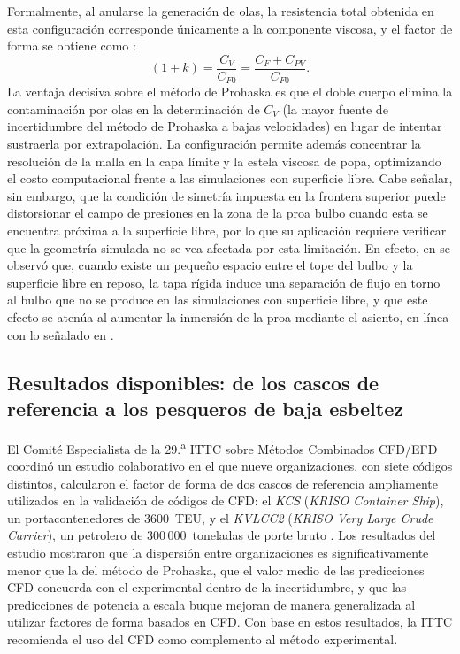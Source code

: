 Formalmente, al anularse la generación de olas, la resistencia
total obtenida en esta configuración corresponde únicamente a la componente
viscosa, y el factor de forma se obtiene como \citep{ITTC_Combined_2021}:
%
\begin{equation}\label{eq:k_doble_cuerpo}
    (1+k) = \frac{C_V}{C_{F0}} = \frac{C_F + C_{PV}}{C_{F0}}.
\end{equation}
%
La ventaja decisiva sobre el método de Prohaska es que el doble cuerpo elimina la contaminación por olas en la determinación de $C_V$ (la mayor fuente de incertidumbre del método de Prohaska a bajas velocidades) en lugar de intentar sustraerla por extrapolación. La configuración permite además concentrar la resolución de la malla en la capa límite y la estela viscosa de popa, optimizando el costo computacional frente a las simulaciones con superficie libre. Cabe señalar, sin embargo, que la condición de simetría impuesta en la frontera superior puede distorsionar el campo de presiones en la zona de la proa bulbo cuando esta se encuentra próxima a la superficie libre, por lo que su aplicación requiere verificar que la geometría simulada no se vea afectada por esta limitación. En efecto, en \citet{quintuna2023} se observó que, cuando existe un pequeño espacio entre el tope del bulbo y la superficie libre en reposo, la tapa rígida induce una separación de flujo en torno al bulbo que no se produce en las simulaciones con superficie libre, y que este efecto se atenúa al aumentar la inmersión de la proa mediante el asiento, en línea con lo señalado en \citet{korkmaz_cfd_2021}.

\subsection{Resultados disponibles: de los cascos de referencia a los pesqueros de baja esbeltez}
\label{sec:estado_arte_ff}

El Comité Especialista de la 29.\textsuperscript{a} ITTC sobre Métodos Combinados
CFD/EFD coordinó un estudio colaborativo en el que nueve organizaciones, con siete
códigos distintos, calcularon el factor de forma de dos cascos de referencia
ampliamente utilizados en la validación de códigos de CFD: el \textit{KCS}
(\emph{KRISO Container Ship}), un portacontenedores de 3600~TEU, y el
\textit{KVLCC2} (\emph{KRISO Very Large Crude Carrier}), un petrolero de
300\,000~toneladas de porte bruto \citep{lee2003kcs, larsson2014gothenburg}.
Los resultados del estudio \citep{ITTC_Combined_2021, korkmaz_cfd_2021}
mostraron que la dispersión entre organizaciones es significativamente menor que
la del método de Prohaska, que el valor medio de las predicciones CFD concuerda
con el experimental dentro de la incertidumbre, y que las predicciones de
potencia a escala buque mejoran de manera generalizada al utilizar factores de
forma basados en CFD. Con base en estos resultados, la ITTC recomienda el uso
del CFD como complemento al método experimental.

